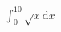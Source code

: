 \documentclass[preview]{standalone}
\begin{document}
\begin{align*}
\int_{0}^{10} \sqrt{x}\mathrm{d}x
\end{align*}
\end{document}
